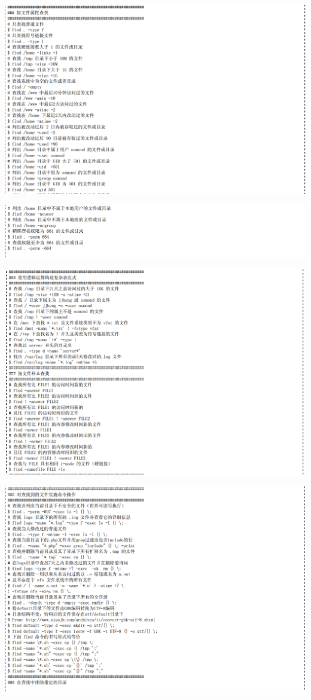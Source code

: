 \documentclass[letterpaper,10pt]{sphinxmanual}
\begin{document}
\includegraphics{eg3.png}

\includegraphics{eg4.png}

\includegraphics{eg5.png}

\includegraphics{eg6.png}
\end{document}

